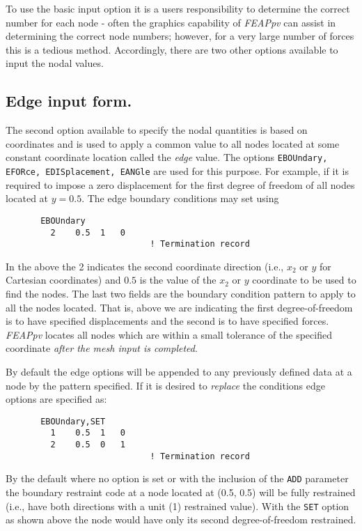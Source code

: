 To use the basic input option
it is a users responsibility to determine the
correct number for each node - often the graphics capability of {\sl FEAPpv}
can assist in determining the correct node numbers; however, for a very large
number of forces this is a tedious method. Accordingly, there are two other
options available to input the nodal values.

\subsection{Edge input form.}

The second option available to specify the
nodal quantities is based on coordinates and is
used to apply a common value to all nodes located
at some constant coordinate location called the {\it edge} value.
The options {\tt EBOUndary, EFORce, EDISplacement, EANGle}
are used for this purpose.  For example, if it is
required to impose a zero displacement for the first degree of freedom
of all nodes located at $y = 0.5$.
The edge boundary conditions may set using
\begin{verbatim}
       EBOUndary
         2    0.5  1   0
                             ! Termination record
\end{verbatim}
In the above the 2 indicates the second coordinate direction (i.e., $x_2$ or $y$
for Cartesian coordinates) and $0.5$ is the value of the $x_2$ or $y$ coordinate
to be used to find the nodes.  The last two fields are the boundary condition
pattern to apply to all the nodes located.  That is, above we are indicating
the first degree-of-freedom is to have specified displacements and the
second is to have specified forces.
{\sl FEAPpv} locates all nodes which are within a small tolerance of
the specified coordinate {\it after the mesh input is completed}.

By default the edge options will be appended to
any previously defined data at a
node by the pattern specified.  If it is desired to {\it replace} the
conditions edge options are specified as:
\begin{verbatim}
       EBOUndary,SET
         1    0.5  1   0
         2    0.5  0   1
                             ! Termination record
\end{verbatim}
By the default where no option is set or
with the inclusion of the {\tt ADD} parameter the boundary  restraint code
at a node located at (0.5, 0.5) will be fully restrained (i.e., have both
directions with a unit (1) restrained value).  With the {\tt SET} option
as shown above
the node would have only its second degree-of-freedom restrained.

